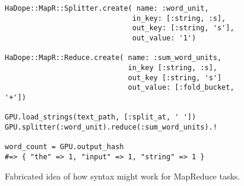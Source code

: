\begin{figure*}
\begin{lstlisting}
HaDope::MapR::Splitter.create( name: :word_unit,
                              in_key: [:string, :s],
                              out_key: [:string, 's'],
                              out_value: '1')
 
HaDope::MapR::Reduce.create( name: :sum_word_units,
                             in_key [:string, :s],
                             out_key [:string, 's']
                             out_value: [:fold_bucket, '+'])
 
GPU.load_strings(text_path, [:split_at, ' '])
GPU.splitter(:word_unit).reduce(:sum_word_units).!
 
word_count = GPU.output_hash
#=> { "the" => 1, "input" => 1, "string" => 1 }
\end{lstlisting}
\caption{Fabricated idea of how syntax might work for MapReduce tasks.}
\label{mp-snippet}
\end{figure*}



